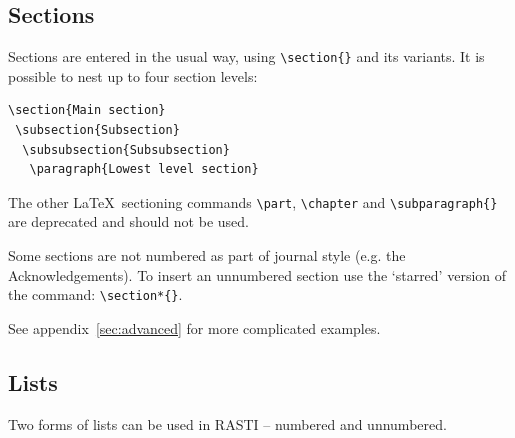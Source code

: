 \documentclass[fleqn,usenatbib,useAMS]{rasti}
\begin{document}
\subsection{Sections}
\label{sec:sections}
Sections are entered in the usual way, using \verb'\section{}' and its variants. It is possible to nest up to four section levels:
\begin{verbatim}
\section{Main section}
 \subsection{Subsection}
  \subsubsection{Subsubsection}
   \paragraph{Lowest level section}
\end{verbatim}
\noindent The other \LaTeX\ sectioning commands \verb'\part', \verb'\chapter' and \verb'\subparagraph{}' are deprecated and should not be used.

Some sections are not numbered as part of journal style (e.g. the Acknowledgements).
To insert an unnumbered section use the `starred' version of the command: \verb'\section*{}'.

See appendix~\ref{sec:advanced} for more complicated examples.

\subsection{Lists}

Two forms of lists can be used in RASTI -- numbered and unnumbered.
\end{document}
